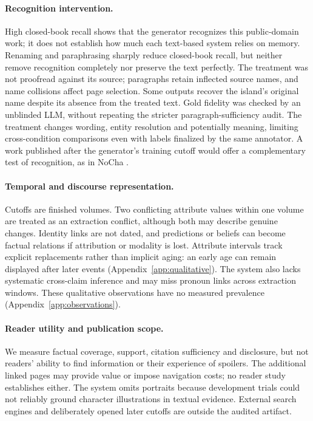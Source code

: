 \paragraph{Recognition intervention.}
High closed-book recall shows that the generator recognizes this public-domain work;
it does not establish how much each text-based system relies on memory.
\ifnwdecon Renaming and paraphrasing sharply reduce closed-book recall, but neither
remove recognition completely nor preserve the text perfectly. The treatment was not
proofread against its source;  paragraphs retain inflected
source names, and name collisions affect page selection. Some outputs recover the
island's original name despite its absence from the treated text. Gold fidelity was
checked by an unblinded LLM, without repeating the stricter paragraph-sufficiency audit.
The treatment changes wording, entity resolution and potentially meaning, limiting
cross-condition comparisons even with labels finalized by the same annotator.
\fi{} A work published after the generator's training cutoff would offer a complementary
test of recognition, as in NoCha \citep{karpinska2024nocha}.

\paragraph{Temporal and discourse representation.}
Cutoffs are finished volumes. Two conflicting attribute values within one volume are
treated as an extraction conflict, although both may describe genuine changes. Identity
links are not dated, and predictions or beliefs can become factual relations if attribution
or modality is lost. Attribute intervals track explicit replacements rather than implicit
aging: an early age can remain displayed after later events (Appendix~\ref{app:qualitative}).
The system also lacks systematic cross-claim inference and may miss pronoun links across
extraction windows. These qualitative observations have no measured prevalence
(Appendix~\ref{app:observations}).

\paragraph{Reader utility and publication scope.}
We measure factual coverage, support, citation sufficiency and disclosure, but not readers'
ability to find information or their experience of spoilers. The additional linked pages
may provide value or impose navigation costs; no reader study establishes either.
The system omits portraits because development trials could not reliably ground character
illustrations in textual evidence. External search engines and deliberately opened later
cutoffs are outside the audited artifact.

